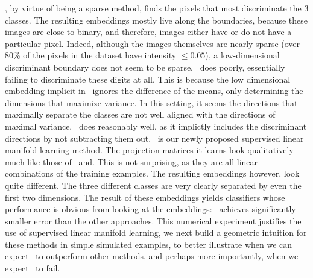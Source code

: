 \documentclass[10pt]{article}
\begin{document}
, by virtue of being a sparse method, finds the pixels that most discriminate the 3 classes.  The resulting embeddings mostly live along the boundaries, because these images are close to binary, and therefore, images either have or do not have a particular pixel. Indeed, although the images themselves are nearly sparse (over 80\% of the pixels in the dataset have intensity $\leq 0.05$),  a low-dimensional discriminant boundary does not seem to be sparse.
\Lda~does poorly, essentially failing to discriminate these digits at all. This is because the low dimensional embedding implicit in \Lda~ignores the difference of the means, only determining the dimensions that maximize variance. In this setting, it seems the directions that maximally separate the classes are not well aligned with the directions of maximal variance.
%
\Pca~does reasonably well, as it implictly includes the discriminant directions by not subtracting them out.
\Lol~is our newly proposed supervised linear manifold learning method.  The projection matrices it learns look qualitatively much like those of \Lda~and\Pca. This is not surprising, as they are all linear combinations of the training examples.
The resulting embeddings however, look quite different.
 The three different classes are very clearly separated by even the first two dimensions.  The result of these embeddings yields classifiers whose performance is obvious from looking at the embeddings: \Lol~achieves significantly smaller error than the other  approaches.
This numerical experiment justifies the use of supervised linear manifold learning, we next build a geometric intuition for these methods in simple simulated examples, to better illustrate when we can expect \Lol~to outperform other methods, and perhaps more importantly, when we expect  \Lol~to fail.
\end{document}
